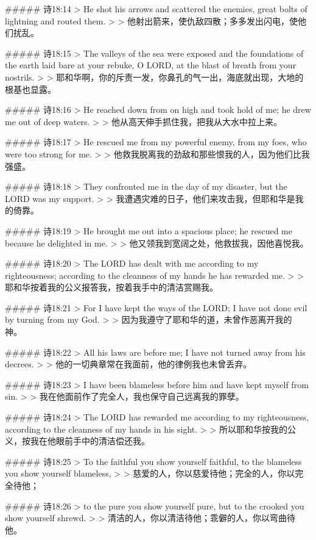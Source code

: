 ##### 诗18:14
> He shot his arrows and scattered the enemies, great bolts of lightning and routed them.
>
> 他射出箭来，使仇敌四散；多多发出闪电，使他们扰乱。


##### 诗18:15
> The valleys of the sea were exposed and the foundations of the earth laid bare at your rebuke, O LORD, at the blast of breath from your nostrils.
>
> 耶和华啊，你的斥责一发，你鼻孔的气一出，海底就出现，大地的根基也显露。


##### 诗18:16
> He reached down from on high and took hold of me; he drew me out of deep waters.
>
> 他从高天伸手抓住我，把我从大水中拉上来。


##### 诗18:17
> He rescued me from my powerful enemy, from my foes, who were too strong for me.
>
> 他救我脱离我的劲敌和那些恨我的人，因为他们比我强盛。


##### 诗18:18
> They confronted me in the day of my disaster, but the LORD was my support.
>
> 我遭遇灾难的日子，他们来攻击我，但耶和华是我的倚靠。


##### 诗18:19
> He brought me out into a spacious place; he rescued me because he delighted in me.
>
> 他又领我到宽阔之处，他救拔我，因他喜悦我。


##### 诗18:20
> The LORD has dealt with me according to my righteousness; according to the cleanness of my hands he has rewarded me.
>
> 耶和华按着我的公义报答我，按着我手中的清洁赏赐我。


##### 诗18:21
> For I have kept the ways of the LORD; I have not done evil by turning from my God.
>
> 因为我遵守了耶和华的道，未曾作恶离开我的　神。


##### 诗18:22
> All his laws are before me; I have not turned away from his decrees.
>
> 他的一切典章常在我面前，他的律例我也未曾丢弃。


##### 诗18:23
> I have been blameless before him and have kept myself from sin.
>
> 我在他面前作了完全人，我也保守自己远离我的罪孽。


##### 诗18:24
> The LORD has rewarded me according to my righteousness, according to the cleanness of my hands in his sight.
>
> 所以耶和华按我的公义，按我在他眼前手中的清洁偿还我。


##### 诗18:25
> To the faithful you show yourself faithful, to the blameless you show yourself blameless,
>
> 慈爱的人，你以慈爱待他；完全的人，你以完全待他；


##### 诗18:26
> to the pure you show yourself pure, but to the crooked you show yourself shrewd.
>
> 清洁的人，你以清洁待他；乖僻的人，你以弯曲待他。


